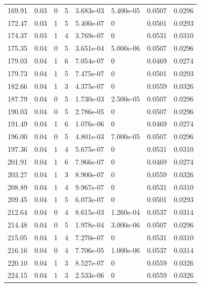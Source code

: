 \documentclass[preview]{standalone}
\begin{document}
{{{\begin{tabular}{L{1.2cm}C{1.2cm} C{0.3cm}C{0.5cm} C{1.4cm}C{1.4cm} C{1.4cm}C{1.4cm}}
  169.91  &  0.03  & 0     &  5 &  3.683e-03  & 5.400e-05  & 0.0507 &  0.0296   \\ 
  172.47  &  0.03  & 1     &  5 &  5.400e-07  & 0  & 0.0501 &  0.0293   \\ 
  174.37  &  0.03  & 1     &  4 &  3.769e-07  & 0  & 0.0531 &  0.0310   \\ 
  175.35  &  0.04  & 0     &  5 &  3.651e-04  & 5.000e-06  & 0.0507 &  0.0296   \\ 
  179.03  &  0.04  & 1     &  6 &  7.054e-07  & 0  & 0.0469 &  0.0274   \\ 
  179.73  &  0.04  & 1     &  5 &  7.475e-07  & 0  & 0.0501 &  0.0293   \\ 
  182.66  &  0.04  & 1     &  3 &  4.375e-07  & 0  & 0.0559 &  0.0326   \\ 
  187.79  &  0.04  & 0     &  5 &  1.730e-03  & 2.500e-05  & 0.0507 &  0.0296   \\ 
  190.03  &  0.04  & 0     &  5 &  2.786e-05  & 0  & 0.0507 &  0.0296   \\ 
  191.49  &  0.04  & 1     &  6 &  1.076e-06  & 0  & 0.0469 &  0.0274   \\ 
  196.00  &  0.04  & 0     &  5 &  4.801e-03  & 7.000e-05  & 0.0507 &  0.0296   \\ 
  197.36  &  0.04  & 1     &  4 &  5.675e-07  & 0  & 0.0531 &  0.0310   \\ 
  201.91  &  0.04  & 1     &  6 &  7.966e-07  & 0  & 0.0469 &  0.0274   \\ 
  203.27  &  0.04  & 1     &  3 &  8.900e-07  & 0  & 0.0559 &  0.0326   \\ 
  208.89  &  0.04  & 1     &  4 &  9.967e-07  & 0  & 0.0531 &  0.0310   \\ 
  209.45  &  0.04  & 1     &  5 &  6.073e-07  & 0  & 0.0501 &  0.0293   \\ 
  212.64  &  0.04  & 0     &  4 &  8.615e-03  & 1.260e-04  & 0.0537 &  0.0314   \\ 
  214.48  &  0.04  & 0     &  5 &  1.978e-04  & 3.000e-06  & 0.0507 &  0.0296   \\ 
  215.05  &  0.04  & 1     &  4 &  7.270e-07  & 0  & 0.0531 &  0.0310   \\ 
  216.16  &  0.04  & 0     &  4 &  7.706e-05  & 1.000e-06  & 0.0537 &  0.0314   \\ 
  220.10  &  0.04  & 1     &  3 &  8.527e-07  & 0  & 0.0559 &  0.0326   \\ 
  224.15  &  0.04  & 1     &  3 &  2.533e-06  & 0  & 0.0559 &  0.0326   \\ 

\end{tabular}}}}
\end{document}
